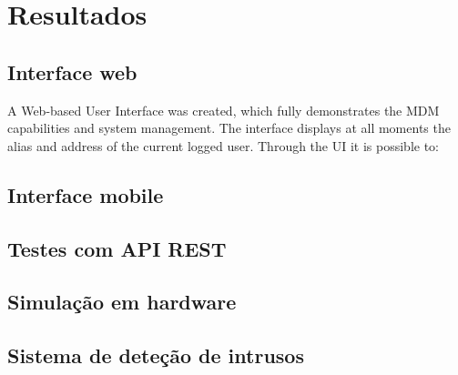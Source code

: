 \chapter{Resultados}





\section{Interface web}


A Web-based User Interface was created, which fully demonstrates the MDM capabilities
and system management. The interface displays at all moments the alias and address of the
current logged user.
Through the UI it is possible to:

\section{Interface mobile}


\section{Testes com API REST}


\section{Simulação em hardware}


\section{Sistema de deteção de intrusos}


